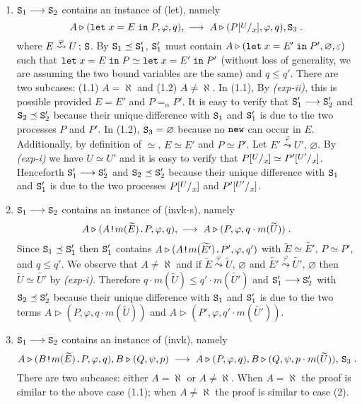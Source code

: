 \documentclass{LMCS}
\theoremstyle{plain}\newtheorem{proposition}[thm]{Proposition}
\theoremstyle{plain}\newtheorem{lemma}[thm]{Lemma}
\theoremstyle{plain}\newtheorem{theorem}[thm]{Theorem}
\theoremstyle{plain}\newtheorem{corollary}[thm]{Corollary}
\newcommand{\rulename}[1]{{\sc(#1)}}
\newcommand{\subst}[2]{[\raisebox{.5ex}{\footnotesize$#1$}  /
                        \raisebox{-.5ex}{\footnotesize$#2$} ]}
\newcommand{\invk}{\mbox{\tt !}}
\newcommand{\prefix}{\mbox{\tt .}}
\newcommand{\letin}[3]{{\tt let} \; #1 = #2 \; {\tt in} \; #3}
\newcommand{\State}{{\tt S}}
\newcommand{\lred}[1]{\stackrel{#1}{\longrightarrow}}
\newcommand{\lleadsto}[1]{\stackrel{#1}{\leadsto}}
\newcommand{\wt}[1]{\widetilde{#1}}
\begin{document}
\begin{enumerate}
\item
$\State_1 \lred{} \State_2$ contains an instance of \rulename{let}, namely
\[A \triangleright (\letin{x}{E}{P}, 
\varphi, q), 
\; \lred{} \; A \triangleright (P\subst{U}{x}, \varphi, q ), \State_3\;.\] 
where $E \lleadsto{\varphi} U \, ; \, \State$. 
By  $\State_1 \preceq \State_1'$,
$\State_1'$ must contain $A \triangleright (\letin{x}{E'}{P'}, \varnothing,
\varepsilon)$ such that $\letin{x}{E}{P} \simeq \letin{x}{E'}{P'}$ (without loss of 
generality, we are assuming the two bound variables are the same) and $q \leq q'$.
There are two subcases: (1.1)
$A = \aleph$ and (1.2) $A \neq \aleph$. In (1.1), By \emph{(exp-ii)}, 
this is possible provided $E = E'$ and $P =_\alpha P'$. It is easy to verify that
$\State_1' \lred{} \State_2'$ and $\State_2 \preceq \State_2'$
because their unique difference with $\State_1$ and $\State_1'$
is due to the two processes $P$ and $P'$.
In (1.2), $\State_3 = \varnothing$ because no ${\tt new}$ can occur in $E$.
Additionally, by definition of $\simeq$, $E \simeq E'$ and $P \simeq P'$.
Let $E' \lleadsto{\varphi} U', \, \varnothing$. By \emph{(exp-i)} we have $U 
\simeq U'$ and it is easy to verify that $P\subst{U}{x} \simeq P'\subst{U'}{x}$.
Henceforth $\State_1' \lred{} \State_2'$ and $\State_2 \preceq \State_2'$
because their unique difference with $\State_1$ and $\State_1'$
is due to the two processes $P\subst{U}{x}$ and $P'\subst{U'}{x}$.

\item
$\State_1 \lred{} \State_2$ contains an instance of \rulename{invk-s}, namely
\[A \triangleright (A \invk m(\wt{E}) \prefix P, \varphi, q), 
\; \lred{} \; A \triangleright (P, \varphi, q \cdot  m(\wt{U}))\;.\]
Since $\State_1 \preceq \State_1'$ then $\State_1'$ contains $A \triangleright (A \invk m(\wt{E'}) \prefix P', \varphi, q')$ with
$\wt{E} \simeq \wt{E'}$, $P \simeq P'$, and $q \leq q'$. 
We observe that $A \neq \aleph$ and if $\wt{E} \lleadsto{\varphi} \wt{U}, \, \varnothing$ and $\wt{E'} \lleadsto{\varphi} \wt{U'}, \, \varnothing$ then
$\wt{U} \simeq \wt{U'}$ by \emph{(exp-i)}. Therefore $q \cdot  m(\wt{U}) \leq
q' \cdot m(\wt{U'})$  and $\State_1' \lred{} \State_2'$ with $\State_2 \preceq
\State_2'$ because their unique difference with $\State_1$ and $\State_1'$
is due to the two terms 
$A \triangleright (P, \varphi, q\cdot m(\wt{U}))$ and 
$A \triangleright (P', \varphi, q'\cdot m(\wt{U'}))$.

\item
$\State_1 \lred{} \State_2$ contains an instance of \rulename{invk},
namely 
\[A \triangleright (B \invk m(\wt{E}) \prefix P, \varphi, q) , 
B \triangleright (Q, \psi, p)
	 \; \lred{} \;
	A \triangleright (P, \varphi, q), B \triangleright (Q, \psi, p 
	\cdot m(\wt{U}) ), \, \State_3\;.\] 
There are two subcases: either $A = \aleph$ or $A \neq \aleph$. When $A = \aleph$
the proof is similar to the above case (1.1); when $A \neq \aleph$ the proof is 
similar to case (2).


\end{enumerate}
\end{document}
